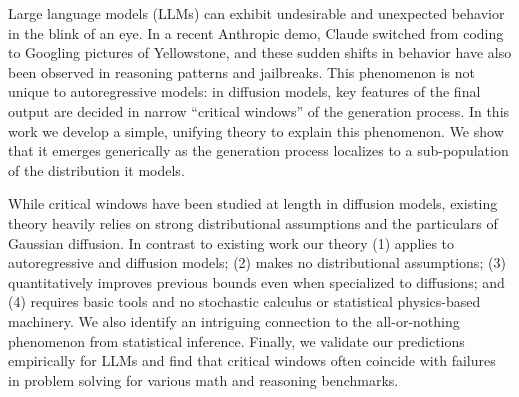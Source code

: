 Large language models (LLMs) can exhibit undesirable and unexpected behavior in the blink of an eye. In a recent Anthropic demo, Claude switched from coding to Googling pictures of Yellowstone, and these sudden shifts in behavior have also been observed in reasoning patterns and jailbreaks. This phenomenon is not unique to autoregressive models: in diffusion models, key features of the final output are decided in narrow ``critical windows'' of the generation process. In this work we develop a simple, unifying theory to explain this phenomenon. We show that it emerges generically as the generation process localizes to a sub-population of the distribution it models.  

While critical windows have been studied at length in diffusion models, existing theory heavily relies on strong distributional assumptions and the particulars of Gaussian diffusion. In contrast to existing work our theory (1) applies to autoregressive and diffusion models; (2) makes no distributional assumptions; (3) quantitatively improves previous bounds even when specialized to diffusions; and (4) requires basic tools and no stochastic calculus or statistical physics-based machinery. We also identify an intriguing connection to the all-or-nothing phenomenon from statistical inference. Finally, we validate our predictions empirically for LLMs and find that critical windows often coincide with failures in problem solving for various math and reasoning benchmarks.
